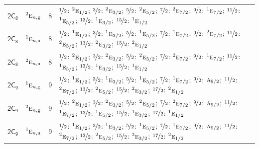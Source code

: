 \documentclass[10pt,a4paper]{article}
\numberwithin{equation}{section}
\newcommand{\grp}[1]{\mathsf{#1}}
\newcommand{\irr}[1]{\text{\normalfont\scshape #1}}
\newcommand{\conjpair}[1]{{}^{#1}}
\newcommand{\ptag}[1]{\mathrm{#1}}
\newlength{\fillwidth}\newlength{\cellwidth}\newlength{\colwidth}
\begin{document}
{\begin{longtable}{@{}llr>{\RaggedRight\arraybackslash}p{\fillwidth}@{}}
\href{2C8.pdf}{$\grp{2C_{8}}$} & $\conjpair{2}\irr{e}_{n,\ptag{g}}$ & 8 & $\nicefrac{1}{2}$: $\conjpair{2}\irr{e}_{1/2}$; $\nicefrac{3}{2}$: $\conjpair{2}\irr{e}_{3/2}$; $\nicefrac{5}{2}$: $\conjpair{2}\irr{e}_{5/2}$; $\nicefrac{7}{2}$: $\conjpair{2}\irr{e}_{7/2}$; $\nicefrac{9}{2}$: $\conjpair{1}\irr{e}_{7/2}$; $\nicefrac{11}{2}$: $\conjpair{1}\irr{e}_{5/2}$; $\nicefrac{13}{2}$: $\conjpair{1}\irr{e}_{3/2}$; $\nicefrac{15}{2}$: $\conjpair{1}\irr{e}_{1/2}$\\
\href{2C8.pdf}{$\grp{2C_{8}}$} & $\conjpair{1}\irr{e}_{n,\ptag{u}}$ & 8 & $\nicefrac{1}{2}$: $\conjpair{1}\irr{e}_{1/2}$; $\nicefrac{3}{2}$: $\conjpair{1}\irr{e}_{3/2}$; $\nicefrac{5}{2}$: $\conjpair{1}\irr{e}_{5/2}$; $\nicefrac{7}{2}$: $\conjpair{1}\irr{e}_{7/2}$; $\nicefrac{9}{2}$: $\conjpair{2}\irr{e}_{7/2}$; $\nicefrac{11}{2}$: $\conjpair{2}\irr{e}_{5/2}$; $\nicefrac{13}{2}$: $\conjpair{2}\irr{e}_{3/2}$; $\nicefrac{15}{2}$: $\conjpair{2}\irr{e}_{1/2}$\\
\href{2C8.pdf}{$\grp{2C_{8}}$} & $\conjpair{2}\irr{e}_{n,\ptag{u}}$ & 8 & $\nicefrac{1}{2}$: $\conjpair{2}\irr{e}_{1/2}$; $\nicefrac{3}{2}$: $\conjpair{2}\irr{e}_{3/2}$; $\nicefrac{5}{2}$: $\conjpair{2}\irr{e}_{5/2}$; $\nicefrac{7}{2}$: $\conjpair{2}\irr{e}_{7/2}$; $\nicefrac{9}{2}$: $\conjpair{1}\irr{e}_{7/2}$; $\nicefrac{11}{2}$: $\conjpair{1}\irr{e}_{5/2}$; $\nicefrac{13}{2}$: $\conjpair{1}\irr{e}_{3/2}$; $\nicefrac{15}{2}$: $\conjpair{1}\irr{e}_{1/2}$\\
\href{2C9.pdf}{$\grp{2C_{9}}$} & $\conjpair{1}\irr{e}_{n,\ptag{g}}$ & 9 & $\nicefrac{1}{2}$: $\conjpair{1}\irr{e}_{1/2}$; $\nicefrac{3}{2}$: $\conjpair{1}\irr{e}_{3/2}$; $\nicefrac{5}{2}$: $\conjpair{1}\irr{e}_{5/2}$; $\nicefrac{7}{2}$: $\conjpair{1}\irr{e}_{7/2}$; $\nicefrac{9}{2}$: $\irr{a}_{9/2}$; $\nicefrac{11}{2}$: $\conjpair{2}\irr{e}_{7/2}$; $\nicefrac{13}{2}$: $\conjpair{2}\irr{e}_{5/2}$; $\nicefrac{15}{2}$: $\conjpair{2}\irr{e}_{3/2}$; $\nicefrac{17}{2}$: $\conjpair{2}\irr{e}_{1/2}$\\
\href{2C9.pdf}{$\grp{2C_{9}}$} & $\conjpair{2}\irr{e}_{n,\ptag{g}}$ & 9 & $\nicefrac{1}{2}$: $\conjpair{2}\irr{e}_{1/2}$; $\nicefrac{3}{2}$: $\conjpair{2}\irr{e}_{3/2}$; $\nicefrac{5}{2}$: $\conjpair{2}\irr{e}_{5/2}$; $\nicefrac{7}{2}$: $\conjpair{2}\irr{e}_{7/2}$; $\nicefrac{9}{2}$: $\irr{a}_{9/2}$; $\nicefrac{11}{2}$: $\conjpair{1}\irr{e}_{7/2}$; $\nicefrac{13}{2}$: $\conjpair{1}\irr{e}_{5/2}$; $\nicefrac{15}{2}$: $\conjpair{1}\irr{e}_{3/2}$; $\nicefrac{17}{2}$: $\conjpair{1}\irr{e}_{1/2}$\\
\href{2C9.pdf}{$\grp{2C_{9}}$} & $\conjpair{1}\irr{e}_{n,\ptag{u}}$ & 9 & $\nicefrac{1}{2}$: $\conjpair{1}\irr{e}_{1/2}$; $\nicefrac{3}{2}$: $\conjpair{1}\irr{e}_{3/2}$; $\nicefrac{5}{2}$: $\conjpair{1}\irr{e}_{5/2}$; $\nicefrac{7}{2}$: $\conjpair{1}\irr{e}_{7/2}$; $\nicefrac{9}{2}$: $\irr{a}_{9/2}$; $\nicefrac{11}{2}$: $\conjpair{2}\irr{e}_{7/2}$; $\nicefrac{13}{2}$: $\conjpair{2}\irr{e}_{5/2}$; $\nicefrac{15}{2}$: $\conjpair{2}\irr{e}_{3/2}$; $\nicefrac{17}{2}$: $\conjpair{2}\irr{e}_{1/2}$\\

\end{longtable}}
\end{document}
